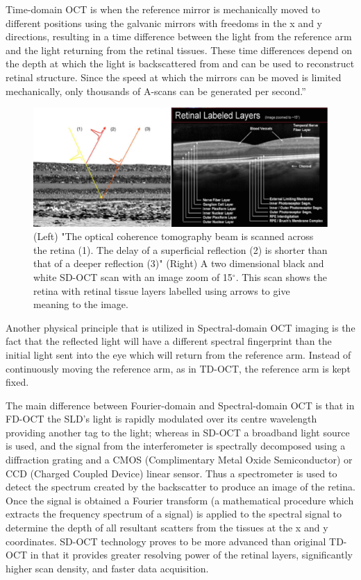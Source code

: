 Time-domain OCT is when the reference mirror is mechanically moved to different
positions using the galvanic mirrors with freedoms in the x and y directions,
resulting in a time difference between the light from the reference arm and the
light returning from the retinal tissues.  These time differences depend on the
depth at which the light is backscattered from and can be used to reconstruct
retinal structure.  Since the speed at which the mirrors can be moved is limited
mechanically, only thousands of A-scans can be generated per second.” \cite{mbib_4}

\begin{figure}[htbp]
\centering
\includegraphics{figures/morgan_4}
\caption{(Left) "The optical coherence tomography beam is scanned across the retina (1).
The delay of a superficial reflection (2) is shorter than that of a deeper reflection (3)" (Right) A two dimensional black and white SD-OCT scan with an image zoom of 15$^\circ$.\cite{mbib_6}  This scan shows the retina with retinal
tissue layers labelled using arrows to give meaning to the image.\cite{mbib_8} }
\label{fig:m_4}
\end{figure}

Another physical principle that is utilized in Spectral-domain OCT imaging is the
fact that the reflected light will have a different spectral fingerprint than the
initial light sent into the eye which will return from the reference arm.  Instead
of continuously moving the reference arm, as in TD-OCT, the reference arm is kept
fixed.

The main difference between Fourier-domain and Spectral-domain OCT is that in
FD-OCT the SLD’s light is rapidly modulated over its centre wavelength providing
another tag to the light; whereas in SD-OCT a broadband light source is used,
and the signal from the interferometer is spectrally decomposed using a diffraction
grating and a CMOS (Complimentary Metal Oxide Semiconductor) or CCD (Charged Coupled Device) linear sensor.\cite{mbib_4}
Thus a spectrometer is used to detect the spectrum created by the backscatter to
produce an image of the retina.  Once the signal is obtained a Fourier transform
(a mathematical procedure which extracts the frequency spectrum of a signal) is
applied to the spectral signal to determine the depth of all resultant scatters from
the tissues at the x and y coordinates.\cite{mbib_4,mbib_9} SD-OCT technology
proves to be more advanced than original TD-OCT in that it provides greater
resolving power of the retinal layers, significantly higher scan density, and faster
data acquisition. \cite{mbib_2}

